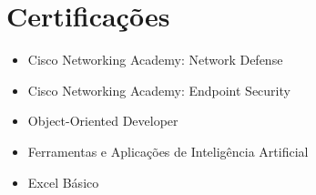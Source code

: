 \documentclass[11pt,a4paper]{article}
\begin{document}
\section{Certificações}
\begin{itemize}
  \item Cisco Networking Academy: Network Defense
  \item Cisco Networking Academy: Endpoint Security
  \item Object-Oriented Developer
  \item Ferramentas e Aplicações de Inteligência Artificial
  \item Excel Básico
\end{itemize}
\end{document}
